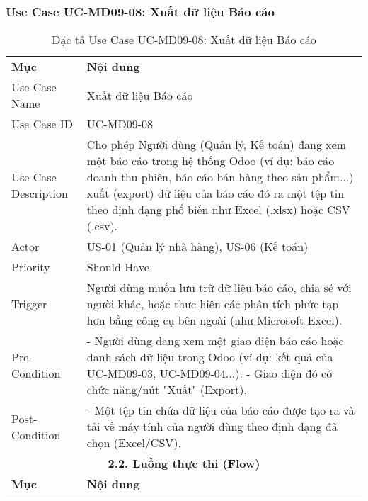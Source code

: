 \subsubsection{Use Case UC-MD09-08: Xuất dữ liệu Báo cáo}

\begin{longtable}{|m{4cm}|p{11cm}|}
\caption{Đặc tả Use Case UC-MD09-08: Xuất dữ liệu Báo cáo} \label{tab:uc_md09_08} \\
\hline

\endhead %
\hline
\endfoot %
\hline
\endlastfoot %
\multicolumn{2}{|c|}{\textbf{2.1. Tóm tắt (Summary)}} \\
\hline
\textbf{Mục} & \textbf{Nội dung} \\
\hline
Use Case Name & Xuất dữ liệu Báo cáo \\
\hline
Use Case ID & UC-MD09-08 \\
\hline
Use Case Description & Cho phép Người dùng (Quản lý, Kế toán) đang xem một báo cáo trong hệ thống Odoo (ví dụ: báo cáo doanh thu phiên, báo cáo bán hàng theo sản phẩm...) xuất (export) dữ liệu của báo cáo đó ra một tệp tin theo định dạng phổ biến như Excel (.xlsx) hoặc CSV (.csv). \\
\hline
Actor & US-01 (Quản lý nhà hàng), US-06 (Kế toán) \\
\hline
Priority & Should Have \\
\hline
Trigger & Người dùng muốn lưu trữ dữ liệu báo cáo, chia sẻ với người khác, hoặc thực hiện các phân tích phức tạp hơn bằng công cụ bên ngoài (như Microsoft Excel). \\
\hline
Pre-Condition & - Người dùng đang xem một giao diện báo cáo hoặc danh sách dữ liệu trong Odoo (ví dụ: kết quả của UC-MD09-03, UC-MD09-04...). \newline - Giao diện đó có chức năng/nút "Xuất" (Export). \\
\hline
Post-Condition & - Một tệp tin chứa dữ liệu của báo cáo được tạo ra và tải về máy tính của người dùng theo định dạng đã chọn (Excel/CSV). \\
\hline
\multicolumn{2}{|c|}{\textbf{2.2. Luồng thực thi (Flow)}} \\
\hline
\textbf{Mục} & \textbf{Nội dung} \\
\hline

\end{longtable}
